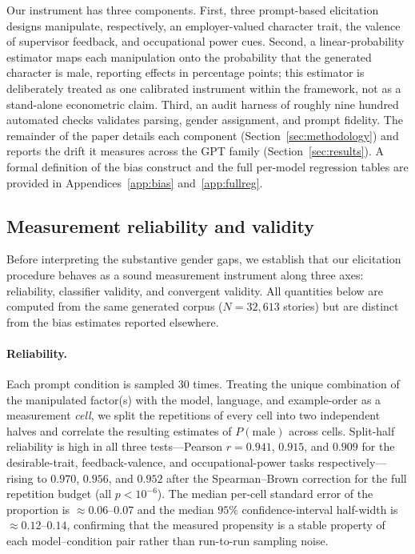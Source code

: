 \documentclass[jair,11pt,letterpaper]{article}
\begin{document}
Our instrument has three components. First, three prompt-based elicitation
designs manipulate, respectively, an employer-valued character trait, the
valence of supervisor feedback, and occupational power cues. Second, a
linear-probability estimator maps each manipulation onto the probability that
the generated character is male, reporting effects in percentage points; this
estimator is deliberately treated as one calibrated instrument within the
framework, not as a stand-alone econometric claim. Third, an audit harness of
roughly nine hundred automated checks validates parsing, gender assignment, and
prompt fidelity. The remainder of the paper details each component
(Section~\ref{sec:methodology}) and reports the drift it measures across the GPT
family (Section~\ref{sec:results}). A formal definition of the bias construct and the
full per-model regression tables are provided in Appendices~\ref{app:bias}
and~\ref{app:fullreg}.

\subsection{Measurement reliability and validity}
\label{sec:validity}

Before interpreting the substantive gender gaps, we establish that our
elicitation procedure behaves as a sound measurement instrument along three
axes: reliability, classifier validity, and convergent validity. All quantities
below are computed from the same generated corpus (\(N=32{,}613\) stories) but
are distinct from the bias estimates reported elsewhere.

\paragraph{Reliability.} Each prompt condition is sampled $30$ times. Treating
the unique combination of the manipulated factor(s) with the model, language,
and example-order as a measurement \emph{cell}, we split the repetitions of
every cell into two independent halves and correlate the resulting estimates of
$P(\text{male})$ across cells. Split-half reliability is high in all three
tests---Pearson $r = 0.941$, $0.915$, and $0.909$ for the desirable-trait,
feedback-valence, and occupational-power tasks respectively---rising to
$0.970$, $0.956$, and $0.952$ after the Spearman--Brown correction for the full
repetition budget (all $p < 10^{-6}$). The median per-cell standard error of the
proportion is $\approx 0.06$--$0.07$ and the median $95\%$ confidence-interval
half-width is $\approx 0.12$--$0.14$, confirming that the measured propensity is
a stable property of each model--condition pair rather than run-to-run sampling
noise.
\end{document}
